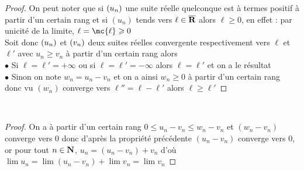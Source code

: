 		\begin{proof}
		On peut noter que si $(u_n)$ une suite réelle quelconque est à termes positif à partir d'un certain rang et si $(u_n)$ tends vers $\ell\in \overline{{\mathbf{R}}}$ alors $\ell \geqslant0$, en effet : par unicité de la limite, $\ell = \mc{\ell}\geqslant 0$\vspace*{0.2cm}\\
		Soit donc $(u_n)$ et $(v_n)$ deux suites réelles convergente respectivement vers $\ell$ et $\ell'$ avec $u_n\geqslant v_n$ à partir d'un certain rang alors\\
		\hspace*{0.5cm} $\bullet$ Si $\ell=\ell'=+\infty$ ou si $\ell=\ell'=-\infty$ alors $\ell=\ell'$ et on a le résultat\\
		\hspace*{0.5cm} $\bullet$ Sinon on note $w_n = u_n-v_n$ et on a ainsi $w_n\geqslant 0$ à partir d'un certain rang donc vu $(w_n)$ converge vers $\ell''=\ell-\ell'$ alors $\ell\geqslant\ell'$
		\end{proof}
		${}$ \\ 
		\vspace*{0.5cm} \\ 
		\begin{proof}
		On a à partir d'un certain rang $0\leqslant u_n-v_n \leqslant w_n-v_n$ et $(w_n-v_n)$ converge vers $0$ donc d'après la propriété précédente $(u_n-v_n)$ converge vers $0$, or pour tout $n\in{\mathbf{N}}$, $u_n = (u_n-v_n)+v_n$ d'où $\lim u_n = \lim (u_n-v_n) + \lim v_n = \lim v_n$
		\end{proof}
		${}$ \\ 
